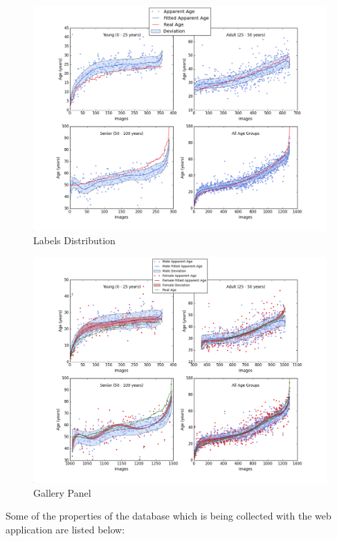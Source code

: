 \begin{figure}[h!]
	\centering
	\includegraphics[width=\textwidth]{figures/Labels_across_img}
	\caption{Labels Distribution}
	\label{fig:apparent_real}
\end{figure}

\begin{figure}[h!]
	\centering
	\includegraphics[width=\textwidth]{figures/Labels_across_img_gender}
	\caption{Gallery Panel}
	\label{fig:gender}
\end{figure}


Some of the properties of the database which is being collected with the web application are listed below:

